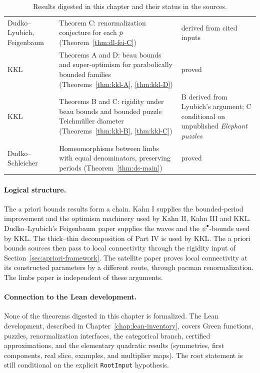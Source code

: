 \begin{table}[ht]
\begin{tabularx}{\textwidth}{@{}>{\raggedright\arraybackslash}p{}>{\raggedright\arraybackslash}X>{\raggedright\arraybackslash}p{}@{}}
Dudko--Lyubich, Feigenbaum &
Theorem C: renormalization conjecture for each $\bar p$ (Theorem~\ref{thm:dl-fei-C}) &
derived from cited inputs\\
KKL &
Theorems A and D: beau bounds and super-optimism for parabolically bounded families (Theorems~\ref{thm:kkl-A}, \ref{thm:kkl-D}) &
proved\\
KKL &
Theorems B and C: rigidity under beau bounds and bounded puzzle Teichm\"uller diameter (Theorems~\ref{thm:kkl-B}, \ref{thm:kkl-C}) &
B derived from Lyubich's argument; C conditional on unpublished \emph{Elephant puzzles}\\
Dudko--Schleicher &
Homeomorphisms between limbs with equal denominators, preserving periods (Theorem~\ref{thm:ds-main}) &
proved\\
\end{tabularx}
\caption{Results digested in this chapter and their status in the sources.}
\label{tab:apriori-summary}
\end{table}

\paragraph{Logical structure.}
The a priori bounds results form a chain.  Kahn I supplies the bounded-period improvement and the optimism machinery used by
Kahn II, Kahn III and KKL.  Dudko--Lyubich's Feigenbaum paper supplies the waves and the $\psi^\bullet$-bounds used by KKL.  The
thick--thin decomposition of Part IV is used by KKL.  The a priori bounds sources then pass to local connectivity through the
rigidity input of Section~\ref{sec:apriori-framework}.  The satellite paper proves local connectivity at its constructed
parameters by a different route, through pacman renormalization.  The limbs paper is independent of these arguments.

\paragraph{Connection to the Lean development.}
None of the theorems digested in this chapter is formalized.  The Lean development, described in
Chapter~\ref{chap:lean-inventory}, covers Green functions, puzzles, renormalization interfaces, the categorical branch,
certified approximations, and the elementary quadratic results (symmetries, first components, real slice, examples,
and multiplier maps).  The root statement is still conditional on the explicit \texttt{RootInput} hypothesis.

